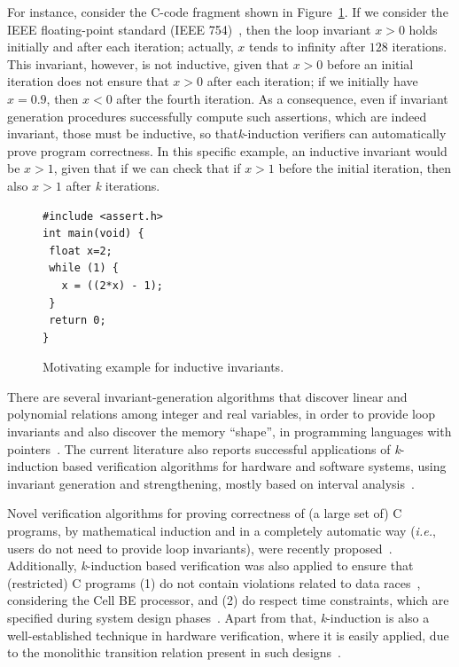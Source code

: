 \documentclass[format=acmsmall, review=false, screen=true]{acmart}
\begin{document}
For instance, consider the C-code fragment shown in Figure~\ref{figure:inductive-invariant}. If we consider the IEEE floating-point standard (IEEE 754)~\cite{4610935,Goldberg91whatevery}, then  the loop invariant $x>0$ holds initially and after each iteration; actually, $x$ tends to infinity after $128$ iterations. This invariant, however, is not inductive, given that $x>0$ before an initial iteration does not ensure that $x>0$ after each iteration; if we initially have $x=0.9$, then $x<0$ after the fourth iteration. As a consequence, even if invariant generation procedures successfully compute such assertions, which are indeed invariant, those must be inductive, so that\textit{k}-induction verifiers can automatically prove program correctness. In this specific example, an inductive invariant would be $x>1$, given that if we can check that if $x>1$ before the initial iteration, then also $x>1$ after \textit{k} iterations.
%
\begin{figure}[h]
\centering
\begin{minipage}{0.45\textwidth}
\begin{lstlisting}
#include <assert.h>
int main(void) {
 float x=2;
 while (1) {
   x = ((2*x) - 1);
 }
 return 0;
}
\end{lstlisting}
\end{minipage}
\caption{Motivating example for inductive invariants.}
\label{figure:inductive-invariant}
\end{figure}


There are several invariant-generation algorithms that discover linear and polynomial relations among integer and real variables, in order to provide loop invariants and also discover the memory ``shape'', in programming languages with pointers~\cite{pips:2013,Henry:2012}. The current literature also reports successful applications of \textit{k}-induction based verification algorithms for hardware and software systems, using invariant generation and strengthening, mostly based on interval analysis~\cite{Beyer15}. 

Novel verification algorithms for proving correctness of (a large set of) C programs, by mathematical induction and in a completely automatic way ({\it i.e.}, users do not need to provide loop invariants), were recently proposed~\cite{Gadelha15,Beyer15,Brain15,Rocha15,Kinductor,Rocha17}. Additionally, \textit{k}-induction based verification was also applied to ensure that (restricted) C programs (1) do not contain violations related to data races~\cite{Donaldson10}, considering the Cell BE processor, and (2) do respect time constraints, which are specified during system design phases~\cite{EenS03}. Apart from that, \textit{k}-induction is also a well-established technique in hardware verification, where it is easily applied, due to the monolithic transition relation present in such designs~\cite{EenS03,Sheera00,GrosseLD09}.
\end{document}

